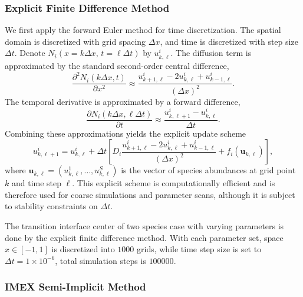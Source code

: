     \subsubsection{Explicit Finite Difference Method}

        We first apply the forward Euler method for time discretization. The spatial domain is discretized with grid spacing $\Delta x$, and time is discretized with step size $\Delta t$. Denote $N_i(x = k\Delta x,\, t = \ell \Delta t)$ by $u_{k,\ell}^i$. The diffusion term is approximated by the standard second-order central difference,
        \begin{equation*}
            \frac{\partial^2 N_i(k \Delta x,t)}{\partial x^2} \approx
            \frac{u_{k+1,\ell}^i - 2 u_{k,\ell}^i + u_{k-1,\ell}^i}{(\Delta x)^2}.
        \end{equation*}
        The temporal derivative is approximated by a forward difference,
        \begin{equation*}
            \frac{\partial N_i(k \Delta x, \ell \Delta t)}{\partial t} \approx
            \frac{u_{k,\ell+1}^i - u_{k,\ell}^i}{\Delta t}.
        \end{equation*}
        Combining these approximations yields the explicit update scheme
        \begin{equation}
            u_{k,\ell+1}^i = u_{k,\ell}^i 
            + \Delta t \left[
                D_i \frac{u_{k+1,\ell}^i - 2 u_{k,\ell}^i + u_{k-1,\ell}^i}{(\Delta x)^2}
                + f_i(\mathbf{u}_{k,\ell})
            \right],
        \end{equation}
        where $\mathbf{u}_{k,\ell} = (u_{k,\ell}^1, \dots, u_{k,\ell}^S)$ is the vector of species abundances at grid point $k$ and time step $\ell$. This explicit scheme is computationally efficient and is therefore used for coarse simulations and parameter scans, although it is subject to stability constraints on $\Delta t$.

        The transition interface center of two species case with varying parameters is done by the explicit finite difference method. With each parameter set, space $x \in [ -1, 1 ] $ is discretized into $1000$ grids, while time step size is set to $\Delta t = 1 \times 10^{-6}$, total simulation steps is $100000$.

    \subsubsection{IMEX Semi-Implicit Method}

